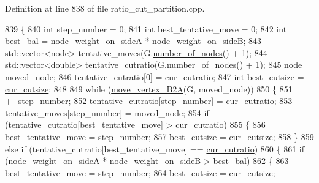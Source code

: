 Definition at line 838 of file ratio\+\_\+cut\+\_\+partition.\+cpp.


\begin{DoxyCode}
839 \{
840     \textcolor{keywordtype}{int} step\_number = 0;
841     \textcolor{keywordtype}{int} best\_tentative\_move = 0;
842     \textcolor{keywordtype}{int} best\_bal = \mbox{\hyperlink{classratio__cut__partition_af1b839e48e498cf8ca93c8ec5df8a686}{node\_weight\_on\_sideA}} * 
      \mbox{\hyperlink{classratio__cut__partition_aa16d1b508db86eb0ba4824642394999a}{node\_weight\_on\_sideB}};
843     std::vector<node> tentative\_moves(G.\mbox{\hyperlink{classgraph_a42c78e0a9f115655e3ff0efe35ebfc4e}{number\_of\_nodes}}() + 1);
844     std::vector<double> tentative\_cutratio(G.\mbox{\hyperlink{classgraph_a42c78e0a9f115655e3ff0efe35ebfc4e}{number\_of\_nodes}}() + 1);
845     \mbox{\hyperlink{classnode}{node}} moved\_node;
846     tentative\_cutratio[0] = \mbox{\hyperlink{classratio__cut__partition_a9dad324884cef5bcdd50122fc98e0860}{cur\_cutratio}};
847     \textcolor{keywordtype}{int} best\_cutsize = \mbox{\hyperlink{classratio__cut__partition_aa01f2d6257fff28739e2431fe826ef71}{cur\_cutsize}};
848 
849     \textcolor{keywordflow}{while} (\mbox{\hyperlink{classratio__cut__partition_ab192d7130a80b6acf7da704162c51e6c}{move\_vertex\_B2A}}(G, moved\_node))
850     \{
851     ++step\_number;
852     tentative\_cutratio[step\_number] = \mbox{\hyperlink{classratio__cut__partition_a9dad324884cef5bcdd50122fc98e0860}{cur\_cutratio}};
853     tentative\_moves[step\_number] = moved\_node;
854     \textcolor{keywordflow}{if} (tentative\_cutratio[best\_tentative\_move] > \mbox{\hyperlink{classratio__cut__partition_a9dad324884cef5bcdd50122fc98e0860}{cur\_cutratio}})
855     \{
856         best\_tentative\_move = step\_number;
857         best\_cutsize = \mbox{\hyperlink{classratio__cut__partition_aa01f2d6257fff28739e2431fe826ef71}{cur\_cutsize}};
858     \}
859     \textcolor{keywordflow}{else} \textcolor{keywordflow}{if} (tentative\_cutratio[best\_tentative\_move] == \mbox{\hyperlink{classratio__cut__partition_a9dad324884cef5bcdd50122fc98e0860}{cur\_cutratio}})
860     \{
861         \textcolor{keywordflow}{if} (\mbox{\hyperlink{classratio__cut__partition_af1b839e48e498cf8ca93c8ec5df8a686}{node\_weight\_on\_sideA}} * \mbox{\hyperlink{classratio__cut__partition_aa16d1b508db86eb0ba4824642394999a}{node\_weight\_on\_sideB}} > best\_bal)
862         \{
863         best\_tentative\_move = step\_number;
864         best\_cutsize = \mbox{\hyperlink{classratio__cut__partition_aa01f2d6257fff28739e2431fe826ef71}{cur\_cutsize}};

\end{DoxyCode}

